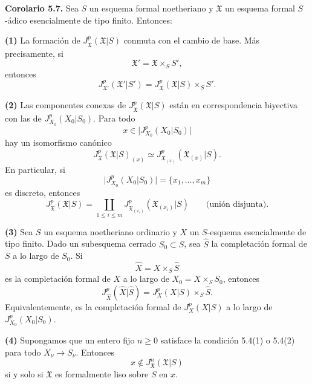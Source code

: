 \par\medskip
\noindent\textbf{Corolario 5.7.}
Sea $S$ un esquema formal noetheriano y $\mathfrak X$ un esquema
formal $S$-ádico esencialmente de tipo finito. Entonces:

\smallskip
\noindent\textbf{(1)} La formación de
$J_{\mathfrak X}^p(\mathfrak X|S)$ conmuta con el cambio de base. Más
precisamente, si
\[
\mathfrak X'=\mathfrak X\times_SS',
\]
entonces
\[
J_{\mathfrak X'}^p(\mathfrak X'|S')
=J_{\mathfrak X}^p(\mathfrak X|S)\times_SS'.
\]

\smallskip
\noindent\textbf{(2)} Las componentes conexas de
$J_{\mathfrak X}^p(\mathfrak X|S)$ están en correspondencia biyectiva
con las de $J_{X_0}^p(X_0|S_0)$. Para todo
\[
x\in\bigl|J_{X_0}^p(X_0|S_0)\bigr|
\]
hay un isomorfismo canónico
\[
J_{\mathfrak X}^p(\mathfrak X|S)_{(x)}
\simeq
J_{\mathfrak X_{(x)}}^p(\mathfrak X_{(x)}|S).
\]
En particular, si
\[
\bigl|J_{X_0}^p(X_0|S_0)\bigr|=\{x_1,\ldots,x_m\}
\]
es discreto, entonces
\[
J_{\mathfrak X}^p(\mathfrak X|S)
=\coprod_{1\leq i\leq m}
 J_{\mathfrak X_{(x_i)}}^p(\mathfrak X_{(x_i)}|S)
\qquad\text{(unión disjunta)}.
\]


\smallskip
\noindent\textbf{(3)} Sea $S$ un esquema noetheriano ordinario y
$X$ un $S$-esquema esencialmente de tipo finito. Dado un subesquema
cerrado $S_0\subset S$, sea $\widehat S$ la completación formal de
$S$ a lo largo de $S_0$. Si
\[
\widehat X=X\times_S\widehat S
\]
es la completación formal de $X$ a lo largo de
$X_0=X\times_SS_0$, entonces
\[
J_{\widehat X}^p(\widehat X|\widehat S)
=J_X^p(X|S)\times_S\widehat S.
\]
Equivalentemente, es la completación formal de $J_X^p(X|S)$ a lo
largo de $J_{X_0}^p(X_0|S_0)$.

\smallskip
\noindent\textbf{(4)} Supongamos que un entero fijo $n\geq0$
satisface la condición 5.4(1) o 5.4(2) para todo
$X_\nu\longrightarrow S_\nu$. Entonces
\[
x\notin J_{\mathfrak X}^n(\mathfrak X|S)
\]
si y solo si $\mathfrak X$ es formalmente liso sobre $S$ en $x$.

